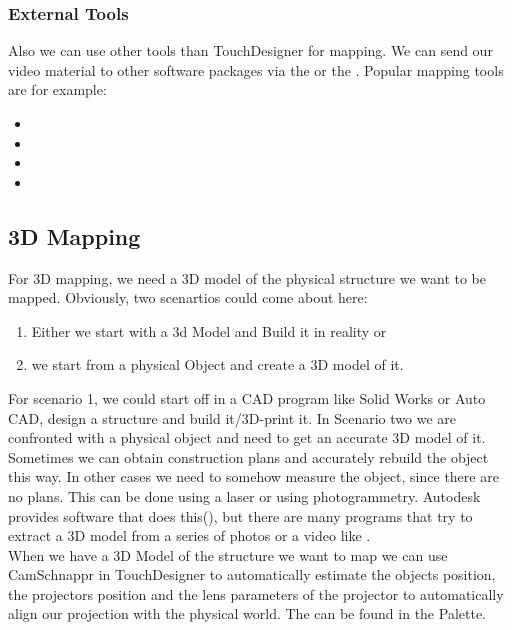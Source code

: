 \subsubsection{External Tools}
Also we can use other tools than TouchDesigner for mapping. We can send our video material to other software packages via the  or the . Popular mapping tools are for example:
\begin{itemize}
	\item {}
	\item {}
	\item {}
	\item {}
\end{itemize}


\subsection{3D Mapping}
For 3D mapping, we need a 3D model of the physical structure we want to be mapped. Obviously, two scenartios could come about here:
\begin{enumerate}
	\item Either we start with a 3d Model and Build it in reality or
	\item  we start from a physical Object and create a 3D model of it.
\end{enumerate}
For scenario 1, we could start off in a CAD program like Solid Works or Auto CAD, design a structure and build it/3D-print it.
In Scenario two we are confronted with a physical object and need to get an accurate 3D model of it. Sometimes we can obtain construction plans and accurately rebuild the object this way. In other cases we need to somehow measure the object, since there are no plans. This can be done using a laser or using photogrammetry. Autodesk provides software that does this(), but there are many programs that try to extract a 3D model from a series of photos or a video like .\\

When we have a 3D Model of the structure we want to map we can use CamSchnappr in TouchDesigner to automatically estimate the objects position, the projectors position and the lens parameters of the projector to automatically align our projection with the physical world.
The  \COMP can be found in the Palette.


